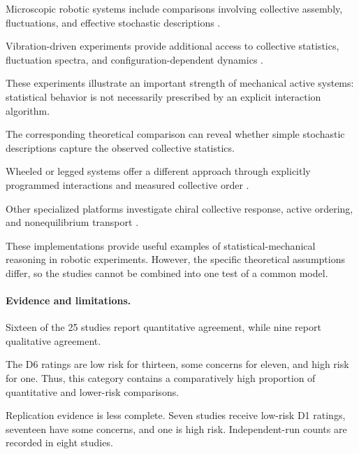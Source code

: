Microscopic robotic systems
include comparisons involving
collective assembly,
fluctuations, and
effective stochastic
descriptions
\cite{Yang2022emergentmicroroboti,Aubret2018targetedassemblyan,Raghavendra2026programmablepersist}.

Vibration-driven experiments
provide additional access
to collective statistics,
fluctuation spectra,
and configuration-dependent
dynamics
\cite{Baconnier2022selectiveandcollec,Boudet2025nonmarkoviandynami,Mayya2019nonuniformrobotde,Zhang2024proteinfoldinginsp,Li2021programmingactivec}.

These experiments illustrate
an important strength
of mechanical active
systems: statistical
behavior is not
necessarily prescribed
by an explicit
interaction algorithm.

The corresponding
theoretical comparison
can reveal whether
simple stochastic
descriptions capture
the observed collective
statistics.

Wheeled or legged
systems offer
a different approach
through explicitly
programmed interactions
and measured collective
order
\cite{Sankar2026trendformationwith,Turgut2008selforganizedflocka,Nishinari2006modellingofselfdr,Spears2004distributedphysics,Barone2024experimentalandnum,Rezeck2021flockingsegregative}.

Other specialized
platforms investigate
chiral collective
response, active
ordering, and
nonequilibrium
transport
\cite{Li2024memoryinducedspont,Bo2026threephasesofodd,Das2025roleofkinematicco,Kaeser2025individualandcolle}.

These implementations
provide useful
examples of
statistical-mechanical
reasoning in
robotic experiments.
However, the
specific theoretical
assumptions differ,
so the studies
cannot be combined
into one test
of a common model.

\paragraph*{Evidence and limitations.}

Sixteen of the 25 studies
report quantitative
agreement, while nine
report qualitative
agreement.

The D6 ratings are
low risk for thirteen,
some concerns for eleven,
and high risk for one.
Thus, this category
contains a comparatively
high proportion of
quantitative and
lower-risk comparisons.

Replication evidence
is less complete.
Seven studies receive
low-risk D1 ratings,
seventeen have
some concerns,
and one is high risk.
Independent-run counts
are recorded in
eight studies.

